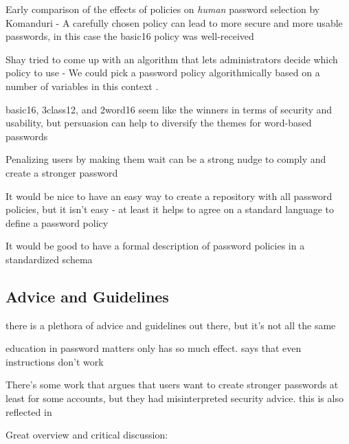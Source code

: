 	\cite{Horsch2016PasswordPolicyMarkup}
	
	\cite{Chiasson2015QuantifyingExpiration}
	\cite{Blocki2013OptimizingPasswordPolicies}
	
	Early comparison of the effects of policies on \textit{human} password selection by Komanduri \etal - A carefully chosen policy can lead to more secure and more usable passwords, in this case the basic16 policy was well-received \cite{Komanduri2011OfPasswordsAndPeople}
	
	
	Shay tried to come up with an algorithm that lets administrators decide which policy to use - We could pick a password policy algorithmically based on a number of variables in this context \cite{Shay2009PolicySimulation}.
	
	basic16, 3class12, and 2word16 seem like the winners in terms of security and usability, but persuasion can help to diversify the themes for word-based passwords \cite{Shay2014CanLongPasswordsBeSecureAndUsable}
	
	
	Penalizing users by making them wait can be a strong nudge to comply and create a stronger password \cite{Malkin2013Waiting}
	
	It would be nice to have an easy way to create a repository with all password policies, but it isn't easy - at least it helps to agree on a standard language to define a password policy \cite{Steves2015PasswordPolicyLanguage}
	
	It would be good to have a formal description of password policies in a standardized schema \cite{Horsch2016PasswordPolicyMarkup}

	\subsection{Advice and Guidelines}
	
	there is a plethora of advice and guidelines out there, but it's not all the same 
	
	education in password matters only has so much effect. 
	\cite{Forget2007HelpingUsers} says that even instructions don't work
	
	There's some work that argues that users want to create stronger passwords at least for some accounts, but they had
	misinterpreted security advice. 
	this is also reflected in \cite{Ur2016PerceptionsPassword}
	
	Great overview and critical discussion: \cite{ZhangKennedy2016RevisitingPasswordRules}
	
